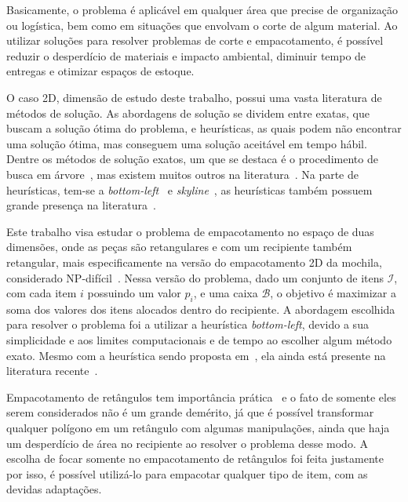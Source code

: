 Basicamente, o problema é aplicável em qualquer área que precise de organização ou logística,
bem como em situações que envolvam o corte de algum material.
Ao utilizar soluções para resolver problemas de corte e empacotamento, é possível reduzir o
desperdício de materiais e impacto ambiental, diminuir tempo de entregas e otimizar espaços
de estoque.

O caso 2D, dimensão de estudo deste trabalho, possui uma vasta literatura de métodos de solução.
As abordagens de solução se dividem entre exatas, que buscam a solução ótima do problema, e
heurísticas, as quais podem não encontrar uma solução ótima, mas conseguem uma solução aceitável em
tempo hábil.
Dentre os métodos de solução exatos, um que se destaca é o procedimento de busca em árvore~\cite{
    beasley1985exact}, mas existem muitos outros na literatura~\cite{exact-solution-techniques,
    fekete1997new,delorme2016bin,kenmochi2009exact}.
Na parte de heurísticas, tem-se a \textit{bottom-left}~\cite{baker1980orthogonal,chehrazad2022fast}
e \textit{skyline}~\cite{wei2011skyline}, as heurísticas também possuem grande presença na
literatura~\cite{burke2004new,rakotonirainy2020improved,hopper2001empirical,chen2019efficient,
    huang2007efficient,hopper2001review}.

Este trabalho visa estudar o problema de empacotamento no espaço de duas dimensões, onde as peças
são retangulares e com um recipiente também retangular, mais especificamente na versão do
empacotamento 2D da mochila, considerado NP-difícil~\cite{2DPackLib}.
Nessa versão do problema, dado um conjunto de itens $\mathcal{I}$, com cada item $i$ possuindo um
valor $p_i$, e uma caixa $\mathcal{B}$, o objetivo é maximizar a soma dos valores dos itens alocados
dentro do recipiente.
A abordagem escolhida para resolver o problema foi a utilizar a heurística \textit{bottom-left},
devido a sua simplicidade e aos limites computacionais e de tempo ao escolher algum método exato.
Mesmo com a heurística sendo proposta em~\citeyear*{baker1980orthogonal}, ela ainda está presente
na literatura recente~\cite{chehrazad2022fast,hopper2001empirical,wei2011skyline}.

Empacotamento de retângulos tem importância prática~\cite{firat2020effective} e o fato de somente
eles serem considerados não é um grande demérito, já que é possível transformar qualquer polígono
em um retângulo com algumas manipulações, ainda que haja um desperdício de área no recipiente ao
resolver o problema desse modo.
A escolha de focar somente no empacotamento de retângulos foi feita justamente por isso, é possível
utilizá-lo para empacotar qualquer tipo de item, com as devidas adaptações.

